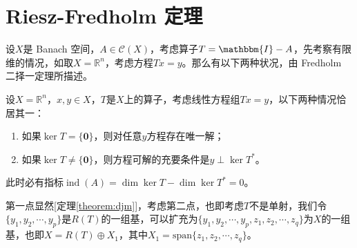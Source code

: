 \newpage
\section{Riesz-Fredholm 定理}
设$X$是 Banach 空间，$A \in \mathscr{C}(X)$，考虑算子$T=\mathbbm{I}-A$，先考察有限维的情况，如取$X=\mathbb{R}^n$，考虑方程$Tx=y$。那么有以下两种状况，由 Fredholm 二择一定理所描述。
\begin{theorem}
设$X=\mathbb{R}^n$，$x,y \in X$，$T$是$X$上的算子，考虑线性方程组$Tx=y$，以下两种情况恰居其一：
\begin{enumerate}
\item 如果$\ker T = \{\mathbf{0}\}$，则对任意$y$方程存在唯一解；
\item 如果$\ker T \neq \{\mathbf{0}\}$，则方程可解的充要条件是$y \perp \ker T^*$。
\end{enumerate}
此时必有指标$\operatorname{ind}(A) = \dim\ker T-\dim\ker T^*=0$。
\end{theorem}
第一点显然[定理\ref{theorem:djm}]，考虑第二点，也即考虑$T$不是单射，我们令$\{y_1,y_2,\cdots,y_p\}$是$R(T)$的一组基，可以扩充为$\{y_1,y_2,\cdots,y_p,z_1,z_2,\cdots,z_q\}$为$X$的一组基，也即$X=R(T)\oplus X_1$，其中$X_1=\text{span}\{z_1,z_2,\cdots,z_q\}$。

